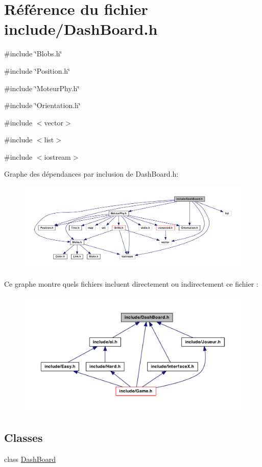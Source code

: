 \hypertarget{a00022}{
\section{Référence du fichier include/DashBoard.h}
\label{a00022}
}
{\ttfamily \#include \char`\"{}Blobs.h\char`\"{}}\par
{\ttfamily \#include \char`\"{}Position.h\char`\"{}}\par
{\ttfamily \#include \char`\"{}MoteurPhy.h\char`\"{}}\par
{\ttfamily \#include \char`\"{}Orientation.h\char`\"{}}\par
{\ttfamily \#include $<$vector$>$}\par
{\ttfamily \#include $<$list$>$}\par
{\ttfamily \#include $<$iostream$>$}\par
Graphe des dépendances par inclusion de DashBoard.h:
\nopagebreak
\begin{figure}[H]
\begin{center}
\leavevmode
\includegraphics[width=400pt]{a00048}
\end{center}
\end{figure}
Ce graphe montre quels fichiers incluent directement ou indirectement ce fichier :
\nopagebreak
\begin{figure}[H]
\begin{center}
\leavevmode
\includegraphics[width=400pt]{a00049}
\end{center}
\end{figure}
\subsection*{Classes}
\begin{DoxyCompactItemize}
\item 
class \hyperlink{a00006}{DashBoard}
\end{DoxyCompactItemize}
